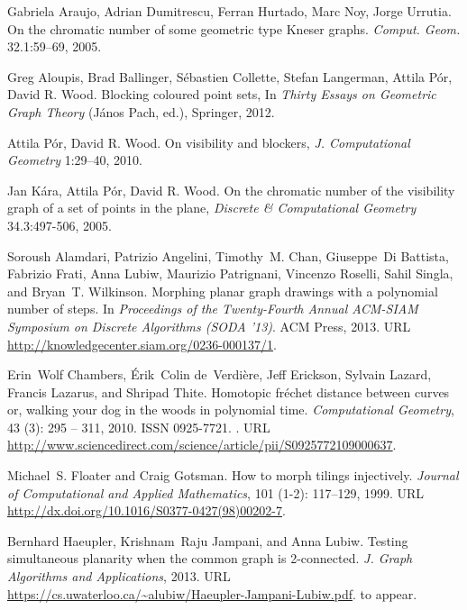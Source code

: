 \documentclass{patmorin}
\begin{document}
\begin{thebibliography}{1}
Gabriela Araujo, Adrian Dumitrescu, Ferran Hurtado, Marc Noy, Jorge Urrutia. On the chromatic number of some geometric type Kneser graphs. \emph{Comput. Geom.} 32.1:59--69, 2005.

 Greg Aloupis, Brad Ballinger, S\'ebastien Collette, Stefan Langerman, Attila P\'or, David R. Wood. Blocking coloured point sets, In \emph{Thirty Essays on Geometric Graph Theory} (J\'anos Pach, ed.), Springer, 2012. 

 Attila P\'or, David R. Wood. On visibility and blockers, \emph{J. Computational Geometry} 1:29--40, 2010. 

 Jan K\'ara, Attila P\'or, David R. Wood. On the chromatic number of the visibility graph of a set of points in the plane, \emph{Discrete \& Computational Geometry} 34.3:497-506, 2005. 

Soroush Alamdari, Patrizio Angelini, Timothy~M. Chan, Giuseppe~Di Battista,
  Fabrizio Frati, Anna Lubiw, Maurizio Patrignani, Vincenzo Roselli, Sahil
  Singla, and Bryan~T. Wilkinson.
\newblock Morphing planar graph drawings with a polynomial number of steps.
\newblock In \emph{Proceedings of the Twenty-Fourth Annual ACM-SIAM Symposium
  on Discrete Algorithms (SODA '13)}. ACM Press, 2013.
\newblock URL \url{http://knowledgecenter.siam.org/0236-000137/1}.

Erin~Wolf Chambers, \'Erik~Colin de~Verdi\`ere, Jeff Erickson, Sylvain Lazard,
  Francis Lazarus, and Shripad Thite.
\newblock Homotopic fr\'echet distance between curves or, walking your dog in
  the woods in polynomial time.
\newblock \emph{Computational Geometry}, 43 (3): 295 -- 311,
  2010.
\newblock ISSN 0925-7721.
\newblock {}.
\newblock URL
  \url{http://www.sciencedirect.com/science/article/pii/S0925772109000637}.

Michael~S. Floater and Craig Gotsman.
\newblock How to morph tilings injectively.
\newblock \emph{Journal of Computational and Applied Mathematics}, 101
  (1-2): 117--129, 1999.
\newblock URL \url{http://dx.doi.org/10.1016/S0377-0427(98)00202-7}.

Bernhard Haeupler, Krishnam~Raju Jampani, and Anna Lubiw.
\newblock Testing simultaneous planarity when the common graph is 2-connected.
\newblock \emph{J. Graph Algorithms and Applications}, 2013.
\newblock URL \url{https://cs.uwaterloo.ca/~alubiw/Haeupler-Jampani-Lubiw.pdf}.
\newblock to appear.


\end{thebibliography}
\end{document}
